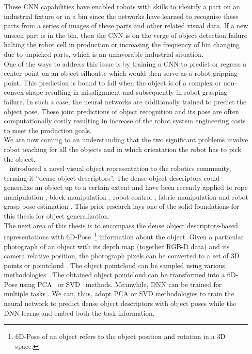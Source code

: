 These \ac{CNN} capabilities have enabled robots with skills to identify a part on an industrial fixture or in a bin since the networks have learned to recognise
these parts from a series of images of these parts and other related visual data.
If a new unseen part is in the bin, then
the \ac{CNN} is on the verge of object detection failure halting the robot cell in production or increasing
the frequency of bin changing due to unpicked parts, which is an unfavorable industrial situation.\\

One of the ways to address this issue is by training a \ac{CNN} to predict or regress a center point on an object
silhoutte which would then serve as a robot gripping point. This prediction is bound to fail when the object is of a complex
or non-convex shape resulting in misalignment and subsequently in robot grasping failure. In such a case, the neural networks
are additionally trained to predict the object pose.
These joint predictions of object recognition and its pose are often computationally costly resulting in
increase of the robot system engineering costs to meet the production goals.\\

We are now coming to an understanding that the two significant problems involve robot teaching for all the objects
and in which orientation the robot has to pick the object.\\

\citeauthor{florence2018dense}~\cite{florence2018dense} introduced a novel visual
object representation to the robotics community,  terming it ``dense object descriptors''. The dense object descriptors could
generalize an object up to a certain extent and have been recently applied to rope manipulation \cite{rope-manipulation},
block manipulation \cite{block-manipulation}, robot control \cite{florence2019self}, fabric manipulation \cite{fabric-manipulation} and
robot grasp pose estimation \cite{kupcsik2021supervised}. This prior research lays one of the solid foundations for
this thesis for object generalization.\\

The next area of this thesis is to encompass the dense object descriptors-based representations with 6D-Pose~\footnote{6D-Pose of an object refers to the object position and rotation in a 3D space.}
information about the object. Given a particular photograph of an object with its depth map (together \acs{RGB-D} data) and its camera relative position,
the photograph pixels can be converted to a set of 3D points or pointcloud \cite{pointcloud-mapping}.
The object pointcloud can be sampled using various methodologies \parencites{image-segment-algos}{object-tracking}.
The obtained object pointcloud can be transformed into a 6D-Pose using \ac{PCA}~\cite{pca} or \ac{SVD}~\cite{svd} methods.
Meanwhile, \ac{DNN} can be trained for multiple tasks \cite{multi-task-dl}. We can, thus, adopt \ac{PCA} or \ac{SVD} methodologies to
train the neural network to predict dense object descriptors with object poses while the \ac{DNN} learns and
embed both the task information.\\

